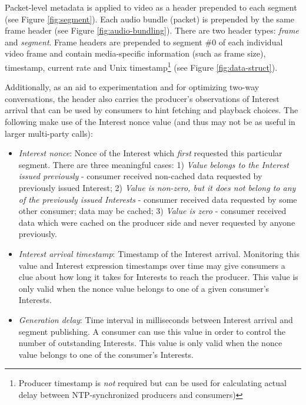 \documentclass{icn/sig-alternate-2012} %
\begin{document}
Packet-level metadata is applied to video as a header prepended to each segment (see Figure \ref{fig:segment}). Each audio bundle (packet) is prepended by the same frame header (see Figure \ref{fig:audio-bundling}). There are two header types: \textit{frame} and \textit{segment}. Frame headers are prepended to segment \#0 of each individual video frame and contain media-specific information (such as frame size), timestamp, current rate and Unix timestamp\footnote{Producer timestamp is \textit{not} required but can be used for calculating actual delay between NTP-synchronized producers and consumers)} (see Figure \ref{fig:data-struct}).

Additionally, as an aid to experimentation and for optimizing two-way conversations, the header also carries the producer's observations of Interest arrival that can be used by consumers to hint fetching and playback choices.  The following make use of the Interest nonce value (and thus may not be as useful in larger multi-party calls): 
\begin{itemize} [label={}]
\item \textit{Interest nonce}: Nonce of the Interest which \textit{first} requested this particular segment. There are three meaningful cases:  1) \textit{Value belongs to the Interest issued previously} - consumer received non-cached data requested by previously issued Interest; 2) \textit{Value is non-zero, but it does not belong to any of the previously issued Interests} - consumer received data requested by some other consumer; data may be cached; 3) \textit{Value is zero} - consumer received data which were cached on the producer side and never requested by anyone previously.
\item \textit{Interest arrival timestamp}: Timestamp of the Interest arrival. Monitoring this value and Interest expression timestamps over time may give consumers a clue about how long it takes for Interests to reach the producer. This value is only valid when the nonce value belongs to one of a given consumer's Interests.
\item \textit{Generation delay}: Time interval in milliseconds between Interest arrival and segment publishing. A consumer can use this value in order to control the number of outstanding Interests. This value is only valid when the nonce value belongs to one of the consumer's Interests.
\end{itemize}
\end{document}
